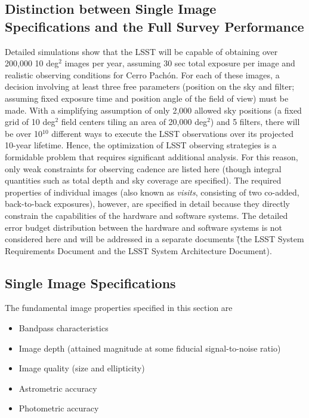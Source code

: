 \subsection{Distinction between Single Image Specifications and the
                        Full Survey Performance \label{sec:defs}}


Detailed simulations show that the LSST will be capable of obtaining over
200,000 10 deg$^2$ images per year, assuming 30 sec total exposure per
image and realistic observing conditions for Cerro Pach\'{o}n. For each of
these images, a decision involving at least three free
parameters (position on the sky and filter; assuming fixed exposure time
and position angle of the field of view) must be made. With a
simplifying assumption of only 2,000 allowed sky positions (\ie a
fixed grid of 10 deg$^2$ field centers tiling an area of 20,000 deg$^2$)
and 5 filters, there will be over 10$^{10}$ different ways to execute the
LSST observations over its projected 10-year lifetime. Hence, the
optimization of LSST observing strategies is a formidable problem that
requires significant additional analysis. For this reason, only weak
constraints for observing cadence are listed here (though integral
quantities such as total depth and sky coverage are specified).
The required properties of individual images (also known as {\it
visits}, consisting of two co-added, back-to-back exposures), however,
are specified
in detail because they directly constrain the capabilities of the hardware
and software systems. The detailed error budget distribution between the hardware
and software systems is not considered here and will be addressed in a
separate documents
\G{(the LSST System Requirements Document and the LSST System Architecture Document)}.




\subsection{              Single Image Specifications              }
\label{singleImageSpecs}


The fundamental image properties specified in this section are
\begin{itemize}
\item Bandpass characteristics
\item Image depth (attained magnitude at some fiducial signal-to-noise ratio)
\item Image quality (size and ellipticity)
\item Astrometric accuracy
\item Photometric accuracy
\end{itemize}

